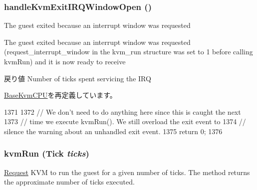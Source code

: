 \hypertarget{classX86KvmCPU_a405e34c9d079e8823ac2a1ca0e816a47}{
\subsubsection[{handleKvmExitIRQWindowOpen}]{ handleKvmExitIRQWindowOpen ()}}
\label{classX86KvmCPU_a405e34c9d079e8823ac2a1ca0e816a47}
The guest exited because an interrupt window was requested

The guest exited because an interrupt window was requested (request\_\-interrupt\_\-window in the kvm\_\-run structure was set to 1 before calling kvmRun) and it is now ready to receive

\begin{DoxyReturn}{戻り値}
Number of ticks spent servicing the IRQ 
\end{DoxyReturn}


\hyperlink{classBaseKvmCPU_a405e34c9d079e8823ac2a1ca0e816a47}{BaseKvmCPU}を再定義しています。


\begin{DoxyCode}
1371 {
1372     // We don't need to do anything here since this is caught the next
1373     // time we execute kvmRun(). We still overload the exit event to
1374     // silence the warning about an unhandled exit event.
1375     return 0;
1376 }
\end{DoxyCode}
\hypertarget{classX86KvmCPU_aed3dbd0c0bf26d82ee56367a3f350506}{
\subsubsection[{kvmRun}]{ kvmRun ({\bf Tick} {\em ticks})}}
\label{classX86KvmCPU_aed3dbd0c0bf26d82ee56367a3f350506}
\hyperlink{classRequest}{Request} KVM to run the guest for a given number of ticks. The method returns the approximate number of ticks executed.

